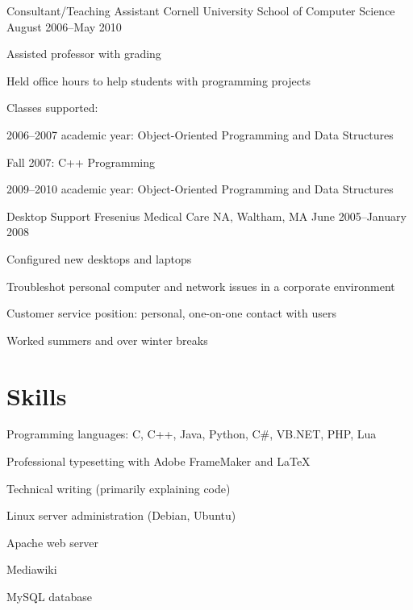 \documentclass{res}
\begin{document}
\begin{resume}
\affiliation
	{Consultant/Teaching Assistant}
	{Cornell University School of Computer Science}
	{August 2006--May 2010}
	\begin{pos}
	\item Assisted professor with grading
	\item Held office hours to help students with programming
	projects
	\item Classes supported:
		\begin{compactitem}
		\item 2006--2007 academic year: Object-Oriented Programming and Data
		Structures
		\item Fall 2007: C++ Programming
		\item 2009--2010 academic year: Object-Oriented Programming and Data
		Structures
		\end{compactitem}
	\end{pos}

\affiliation
	{Desktop Support}
	{Fresenius Medical Care NA, Waltham, MA}
	{June 2005--January 2008}
	\begin{pos}
	\item Configured new desktops and laptops
	\item Troubleshot personal computer and network issues in a corporate environment
	\item Customer service position: personal, one-on-one contact with users
	\item Worked summers and over winter breaks
	\end{pos}

\section{Skills}
	\vspace{10pt}
	\begin{compactitem}
	\item Programming languages: C, C++, Java, Python, C\#, VB.NET, PHP, Lua
	\item Professional typesetting with Adobe FrameMaker and \LaTeX{}
	\item Technical writing (primarily explaining code)
	\item Linux server administration (Debian, Ubuntu)
		\begin{compactitem}
		\item Apache web server
		\item Mediawiki
		\item MySQL database
		\end{compactitem}
	\end{compactitem}

\end{resume}
\end{document}
